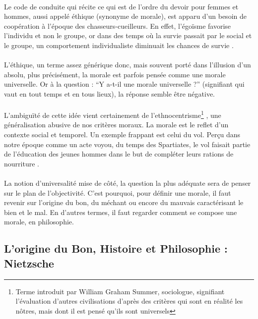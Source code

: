 \documentclass[10pt, french, a4paper]{report}
\begin{document}
\paragraph{}
Le code de conduite qui récite ce qui est de l’ordre du devoir pour femmes et hommes, aussi appelé éthique (synonyme de morale), est apparu d’un besoin de coopération à l’époque des chasseurs-cueilleurs. En effet, l’égoïsme favorise l’individu et non le groupe, or dans des temps où la survie passait par le social et le groupe, un comportement individualiste diminuait les chances de survie \citep{harari_sapiens:_2015}.

\paragraph{}
L'éthique, un terme assez générique donc, mais souvent porté dans l’illusion d’un absolu, plus précisément, la morale est parfois pensée comme une morale universelle. Or à la question : ``Y a-t-il une morale universelle ?'' (signifiant qui vaut en tout temps et en tous lieux), la réponse semble être négative.

\paragraph{}
L’ambiguïté de cette idée vient certainement de l’ethnocentrisme\footnote{Terme introduit par William Graham Summer, sociologue, signifiant l’évaluation d’autres civilisations d’après des critères qui sont en réalité les nôtres, mais dont il est pensé qu’ils sont universels} \citep{sumner_folkways_1906}, une généralisation abusive de nos critères moraux. La morale est le reflet d’un contexte social et temporel. Un exemple frappant est celui du vol. Perçu dans notre époque comme un acte voyou, du temps des Spartiates, le vol faisait partie de l’éducation des jeunes hommes dans le but de compléter leurs rations de nourriture \citep{ducat_du_2017}.

\paragraph{}
La notion d’universalité mise de côté, la question la plus adéquate sera de penser sur le plan de l’objectivité. C'est pourquoi, pour définir une morale, il faut revenir sur l'origine du bon, du méchant ou encore du mauvais caractérisant le bien et le mal. En d'autres termes, il faut regarder comment se compose une morale, en philosophie.

\subsection{L'origine du Bon, Histoire et Philosophie : Nietzsche}
\end{document}
